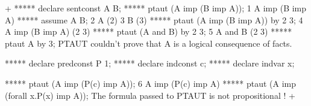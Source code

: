 \label{sec-decproc}




\gfexample+
   ***** declare sentconst A B;
   ***** ptaut (A imp (B imp A));
   1   A imp (B imp A)
   ***** assume A B;
   2   A     (2)
   3   B     (3)
   ***** ptaut (A imp (B imp A)) by 2 3;
   4   A imp (B imp A)  (2 3)
   ***** ptaut (A and B) by 2 3;
   5   A and B  (2 3)
   ***** ptaut A by 3;
   PTAUT couldn't prove that A
   is a logical consequence of facts.
   
   ***** declare predconst P 1;
   ***** declare indconst c;
   ***** declare indvar x;

   ***** ptaut (A imp (P(c) imp A));
   6   A imp (P(c) imp A)     
   ***** ptaut (A imp (forall x.P(x) imp A));
   The formula passed to PTAUT is not propositional !
+   
